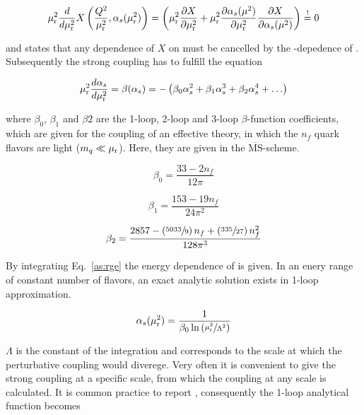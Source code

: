 \begin{equation} 
    \mu_{\mathrm{r}}^2 \frac{d}{d \mu_{\mathrm{r}}^2} X \left(\frac{Q^2}{\mu_{\mathrm{r}}^2},\alpha_{s}(\mu_{\mathrm{r}}^2)\right) = \left(
    \mu_{\mathrm{r}}^2 \frac{\partial X}{\partial \mu_{\mathrm{r}}^2} + \mu_{\mathrm{r}}^2 \frac{\partial
    \alpha_{s}(\mu^2)}{\partial \mu_{\mathrm{r}}^2} \frac{\partial X}{\partial \alpha_{s}(\mu^2)} \right) \stackrel{!}{=} 0 
\end{equation}

and states that any dependence of $X$ on \mur must be cancelled by the
\mur-depedence of \as. Subsequently the strong coupling has to fulfill the
equation

\begin{equation}
    \mu_{\mathrm{r}}^2 \frac{d \alpha_{s}}{d \mu_{\mathrm{r}}^2} = \beta(\alpha_{s}) = - \left( \beta_0 \alpha_{s}^2 + \beta_1 \alpha_{s}^3
    + \beta_2 \alpha_{s}^4 + \ldots \right)
    \label{eq:as_rge}
\end{equation}

where $\beta_0$, $\beta_1$ and $\beta 2$ are the 1-loop, 2-loop and 3-loop 
$\beta$-function coefficients, which are given for the coupling of an effective
theory, in which the $n_f$ quark flavors are light ($m_q \ll \mu_{\mathrm{r}}$). Here, they
are given in the $\overline{\mathrm{MS}}$-scheme.

\begin{equation} 
    \beta_0 = \frac{33 - 2 n_f}{12\pi}
\end{equation}

\begin{equation} 
    \beta_1 = \frac{153 - 19 n_f}{24\pi^2}
\end{equation}

\begin{equation} 
   \beta_2 = \frac{2857 -\left(\sfrac{5033}{9}\right)n_f + \left(\sfrac{335}{27}
   \right)n_f^2}{128 \pi^3}
\end{equation}

By integrating Eq.~\ref{as:rge} the energy dependence of \as is given. In an
enery range of constant number of flavors, an exact analytic solution exists in
1-loop approximation. 

\begin{equation*}
   \alpha_{s}(\mu_{\mathrm{r}}^2) = \frac{1}{\beta_0 \ln \left( \sfrac{\mu_{\mathrm{r}}^2}{\Lambda^2} \right)}
\end{equation*}

$\Lambda$ is the constant of the integration and corresponds to the scale at
which the perturbative coupling would diverege. Very often it is convenient to
give the strong coupling at a specific scale, from which the coupling at any
scale is calculated. It is common practice to report \asmz, consequently the
1-loop analytical function becomes

